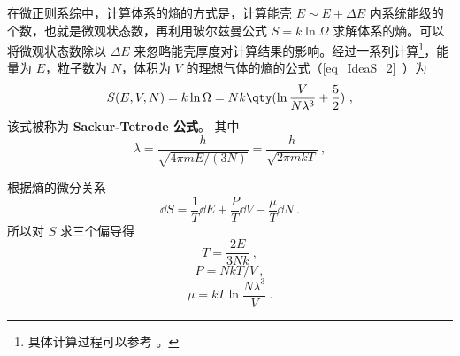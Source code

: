 
\begin{issues}
\issueDraft
\end{issues}


在微正则系综中，计算体系的熵的方式是，计算能壳 $E\sim E+\Delta E$ 内系统能级的个数，也就是微观状态数，再利用玻尔兹曼公式 $S=k\ln \Omega$ 求解体系的熵。可以将微观状态数除以 $\Delta E$ 来忽略能壳厚度对计算结果的影响。经过一系列计算\footnote{具体计算过程可以参考 。}，能量为 $E$，粒子数为 $N$，体积为 $V$ 的理想气体的熵的公式（\autoref{eq_IdeaS_2}~）为
\begin{equation}\label{eq_IdNCE_1}
S(E, V, N) = k\ln \Omega  = Nk \qty(\ln \frac{V}{N\lambda^3} + \frac52)~,
\end{equation}
该式被称为 \textbf{Sackur-Tetrode 公式}。 其中
\begin{equation}\label{eq_IdNCE_2}
\lambda = \frac{h}{\sqrt{4\pi mE/(3N)}} = \frac{h}{\sqrt{2\pi mkT}}~,
\end{equation}

根据熵的微分关系
\begin{equation}
\dd{S} = \frac{1}{T} \dd{E} + \frac{P}{T} \dd{V} - \frac{\mu}{T} \dd{N}~.
\end{equation}
所以对 $S$ 求三个偏导得
\begin{equation}
T = \frac{2E}{3Nk}~,
\end{equation}
\begin{equation}
P = NkT/V~,
\end{equation}
\begin{equation}
\mu = kT \ln \frac{N\lambda^3}{V}~.
\end{equation}
